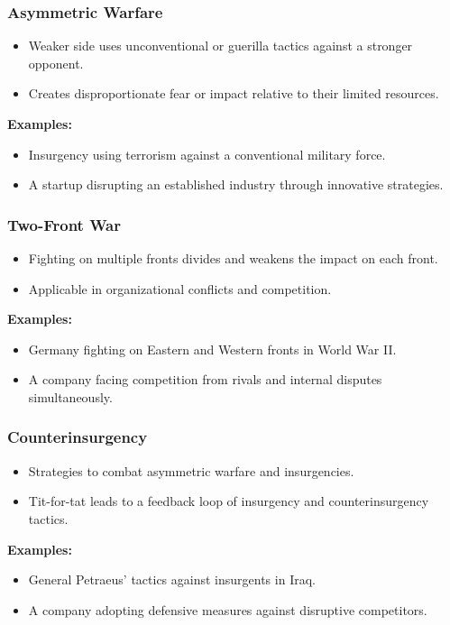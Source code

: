 \begin{frame}[fragile]\frametitle{Asymmetric Warfare}
\begin{itemize}
    \item Weaker side uses unconventional or guerilla tactics against a stronger opponent.
    \item Creates disproportionate fear or impact relative to their limited resources.
\end{itemize}
\textbf{Examples:}
\begin{itemize}
    \item Insurgency using terrorism against a conventional military force.
    \item A startup disrupting an established industry through innovative strategies.
\end{itemize}
\end{frame}

\begin{frame}[fragile]\frametitle{Two-Front War}
\begin{itemize}
    \item Fighting on multiple fronts divides and weakens the impact on each front.
    \item Applicable in organizational conflicts and competition.
\end{itemize}
\textbf{Examples:}
\begin{itemize}
    \item Germany fighting on Eastern and Western fronts in World War II.
    \item A company facing competition from rivals and internal disputes simultaneously.
\end{itemize}
\end{frame}

\begin{frame}[fragile]\frametitle{Counterinsurgency}
\begin{itemize}
    \item Strategies to combat asymmetric warfare and insurgencies.
    \item Tit-for-tat leads to a feedback loop of insurgency and counterinsurgency tactics.
\end{itemize}
\textbf{Examples:}
\begin{itemize}
    \item General Petraeus' tactics against insurgents in Iraq.
    \item A company adopting defensive measures against disruptive competitors.
\end{itemize}
\end{frame}

